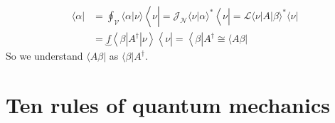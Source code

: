 \begin{equation}
\begin{aligned}\langle\alpha| &=\oint_{\mathcal{V}}\langle\alpha | \nu\rangle\left\langle\nu\left|=\mathcal{J}_{\mathcal{N}}\langle\nu | \alpha\rangle^{*}\left\langle\nu\left|=\mathcal{L}\langle\nu|A| \beta\rangle^{*}\langle\nu|\right.\right.\right.\right.\\ &=\underbrace{f}\left\langle\beta\left|A^{\dagger}\right| \nu\right\rangle\left\langle\nu\left|=\left\langle\beta\left|A^{\dagger} \cong\langle A \beta|\right.\right.\right.\right.\end{aligned}
\end{equation}
So we understand $\langle A\beta|$ as $\langle\beta| A^{\dagger}$.
\section{Ten rules of quantum mechanics}
